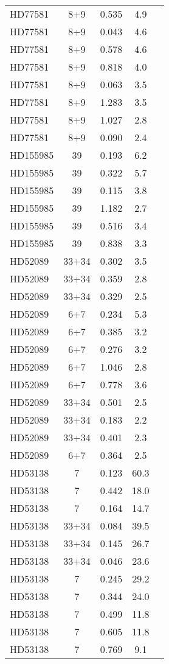 \begin{table*}
\begin{tabular}{l c c c c}
HD77581 & 8+9 & 0.535 & 4.9\\ 
HD77581 & 8+9 & 0.043 & 4.6\\ 
HD77581 & 8+9 & 0.578 & 4.6\\ 
HD77581 & 8+9 & 0.818 & 4.0\\ 
HD77581 & 8+9 & 0.063 & 3.5\\ 
HD77581 & 8+9 & 1.283 & 3.5\\ 
HD77581 & 8+9 & 1.027 & 2.8\\ 
HD77581 & 8+9 & 0.090 & 2.4\\ 
\hline
HD155985 & 39 & 0.193 & 6.2\\ 
HD155985 & 39 & 0.322 & 5.7\\ 
HD155985 & 39 & 0.115 & 3.8\\ 
HD155985 & 39 & 1.182 & 2.7\\ 
HD155985 & 39 & 0.516 & 3.4\\ 
HD155985 & 39 & 0.838 & 3.3\\ 
\hline
HD52089 & 33+34 & 0.302 & 3.5\\ 
HD52089 & 33+34 & 0.359 & 2.8\\ 
HD52089 & 33+34 & 0.329 & 2.5\\ 
HD52089 & 6+7 & 0.234 & 5.3\\ 
HD52089 & 6+7 & 0.385 & 3.2\\ 
HD52089 & 6+7 & 0.276 & 3.2\\ 
HD52089 & 6+7 & 1.046 & 2.8\\ 
HD52089 & 6+7 & 0.778 & 3.6\\ 
HD52089 & 33+34 & 0.501 & 2.5\\ 
HD52089 & 33+34 & 0.183 & 2.2\\ 
HD52089 & 33+34 & 0.401 & 2.3\\ 
HD52089 & 6+7 & 0.364 & 2.5\\ 
\hline
HD53138 & 7 & 0.123 & 60.3\\ 
HD53138 & 7 & 0.442 & 18.0\\ 
HD53138 & 7 & 0.164 & 14.7\\ 
HD53138 & 33+34 & 0.084 & 39.5\\ 
HD53138 & 33+34 & 0.145 & 26.7\\ 
HD53138 & 33+34 & 0.046 & 23.6\\ 
HD53138 & 7 & 0.245 & 29.2\\ 
HD53138 & 7 & 0.344 & 24.0\\ 
HD53138 & 7 & 0.499 & 11.8\\ 
HD53138 & 7 & 0.605 & 11.8\\ 
HD53138 & 7 & 0.769 & 9.1\\ 

\end{tabular}
\end{table*}
